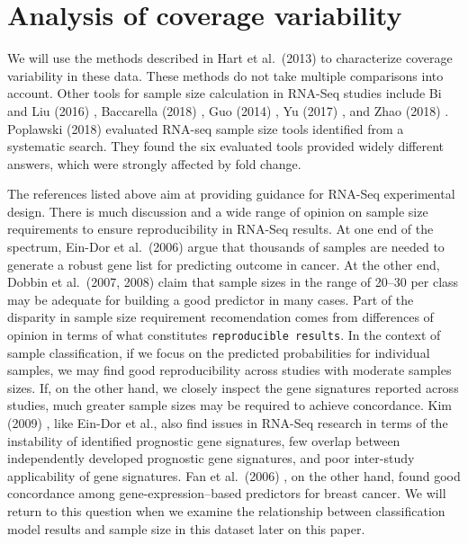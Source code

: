 \documentclass[
]{book}
\begin{document}
\hypertarget{analysis-of-coverage-variability}{%
\section{Analysis of coverage variability}\label{analysis-of-coverage-variability}}

We will use the methods described in Hart et al.~(2013) \citep{Hart:2013aa}
to characterize coverage variability in these data.
These methods do not take multiple comparisons into account.
Other tools for sample size calculation in RNA-Seq studies include
Bi and Liu (2016) \citep{Bi:2016aa}, Baccarella (2018) \citep{Baccarella:2018aa},
Guo (2014) \citep{Guo:2014aa}, Yu (2017) \citep{Yu:2017aa}, and
Zhao (2018) \citep{Zhao:2018ab}.
Poplawski (2018) \citep{Poplawski:2017aa}
evaluated RNA-seq sample size tools identified from a systematic search. They found the six evaluated tools provided widely different answers, which were strongly affected by fold change.

The references listed above aim at providing guidance for RNA-Seq experimental design.
There is much discussion and a wide range of opinion on sample size requirements
to ensure reproducibility in RNA-Seq results. At one end of the spectrum,
Ein-Dor et al.~(2006) \citep{Ein-Dor:2006aa} argue that thousands of samples are needed to
generate a robust gene list for predicting outcome in cancer. At the other end,
Dobbin et al.~(2007, 2008) \citep{Dobbin:2007aa, Dobbin:2008aa} claim that sample sizes in
the range of 20--30 per class may be adequate for building a good predictor in many cases.
Part of the disparity in sample size requirement recomendation comes from
differences of opinion in terms of what constitutes \texttt{reproducible\ results}.
In the context of sample classification, if we focus on the predicted probabilities
for individual samples, we may find good reproducibility across studies with
moderate samples sizes. If, on the other hand, we closely inspect the gene
signatures reported across studies, much greater sample sizes may be required to
achieve concordance. Kim (2009) \citep{Kim:2009aa}, like Ein-Dor et al., also find
issues in RNA-Seq research in terms of the instability of identified prognostic
gene signatures, few overlap between independently developed prognostic gene signatures, and
poor inter-study applicability of gene signatures. Fan et al.~(2006) \citep{Fan:2006aa},
on the other hand, found good concordance among gene-expression--based predictors
for breast cancer. We will return to this question when we examine
the relationship between classification model results and sample size in this
dataset later on this paper.
\end{document}
